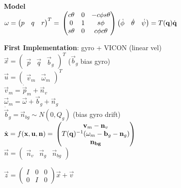 \textbf{Model}\\
$\vec{\omega} = \begin{pmatrix} p & q & r\end{pmatrix}^T = \\
\begin{pmatrix}
  c \theta & 0 & -c \phi s \theta \\
  0 & 1 & s \phi \\
  s \theta & 0 & c \phi c \theta
\end{pmatrix}
\begin{pmatrix}
  \dot{\phi} & \dot{\theta} & \dot{\psi}
\end{pmatrix} = T(\vec{q}) \dot{\vec{q}}
$

\textbf{First Implementation}: gyro + VICON (linear vel)\\
$\vec{x} = \begin{pmatrix}\vec{p}   & \vec{q} &
\vec{b}_g\end{pmatrix}^T$ ($\vec{b}_g$ bias gyro)\\
$\vec{u} = \begin{pmatrix}\vec{v}_m & \vec{\omega}_m\end{pmatrix}^T$\\
$\vec{v}_m = \dot{\vec{p}}_m + \vec{n}_v$\\
$\vec{\omega}_m = \vec{\omega} + \vec{b}_g + \vec{n}_g$\\
$\dot{\vec{b}}_g = \vec{n}_{bg} \sim N(0, Q_g)$ (bias gyro drift)\\

$\dot{\vec{x}} = f(\vec{x}, \vec{u}, \vec{n}) = \\
 \begin{pmatrix}
   \vec{v}_m - \vec{n}_v\\
   T(\vec{q})^{-1} ( \vec{\omega}_m - \vec{b}_g - \vec{n}_g) \\
   \vec{n_{bg}}
 \end{pmatrix}
$\\

$\vec{n} =
\begin{pmatrix} \vec{n}_v & \vec{n}_g & \vec{n}_{bg}\end{pmatrix}$

$\vec{z} = \begin{pmatrix} I & 0 & 0\\0 & I & 0\end{pmatrix} \vec{x} +
\vec{v}$

